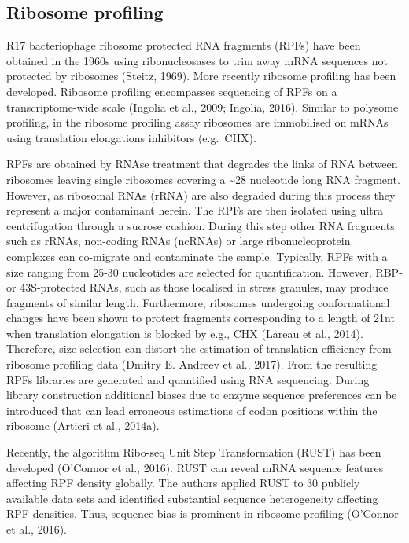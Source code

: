 \documentclass[
  12pt,
  openany]{book}
\begin{document}
\subsection{Ribosome profiling} \label{riboseq}

R17 bacteriophage ribosome protected RNA fragments (RPFs) have been obtained in the 1960s using ribonucleosases to trim away mRNA sequences not protected by ribosomes (Steitz, 1969). More recently ribosome profiling has been developed. Ribosome profiling encompasses sequencing of RPFs on a transcriptome-wide scale (Ingolia et al., 2009; Ingolia, 2016). Similar to polysome profiling, in the ribosome profiling assay ribosomes are immobilised on mRNAs using translation elongations inhibitors (e.g.~CHX).

RPFs are obtained by RNAse treatment that degrades the links of RNA between ribosomes leaving single ribosomes covering a \textasciitilde28 nucleotide long RNA fragment. However, as ribosomal RNAs (rRNA) are also degraded during this process they represent a major contaminant herein. The RPFs are then isolated using ultra centrifugation through a sucrose cushion. During this step other RNA fragments such as rRNAs, non-coding RNAs (ncRNAs) or large ribonucleoprotein complexes can co-migrate and contaminate the sample. Typically, RPFs with a size ranging from 25-30 nucleotides are selected for quantification. However, RBP-or 43S-protected RNAs, such as those localised in stress granules, may produce fragments of similar length. Furthermore, ribosomes undergoing conformational changes have been shown to protect fragments corresponding to a length of 21nt when translation elongation is blocked by e.g., CHX (Lareau et al., 2014). Therefore, size selection can distort the estimation of translation efficiency from ribosome profiling data (Dmitry E. Andreev et al., 2017). From the resulting RPFs libraries are generated and quantified using RNA sequencing. During library construction additional biases due to enzyme sequence preferences can be introduced that can lead erroneous estimations of codon positions within the ribosome (Artieri et al., 2014a).

Recently, the algorithm Ribo-seq Unit Step Transformation (RUST) has been developed (O'Connor et al., 2016). RUST can reveal mRNA sequence features affecting RPF density globally. The authors applied RUST to 30 publicly available data sets and identified substantial sequence heterogeneity affecting RPF densities. Thus, sequence bias is prominent in ribosome profiling (O'Connor et al., 2016).
\end{document}
